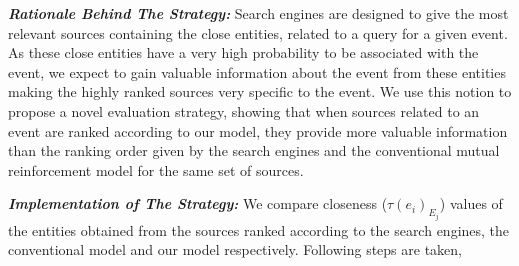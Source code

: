\noindent \textit{\textbf{Rationale Behind The Strategy:}} Search engines are designed to give the most relevant sources containing the close entities, related to a query for a given event. As these close entities have a very high probability to be associated with the event, we expect to gain valuable information about the event from these entities making the highly ranked sources very specific to the event. We use this notion to propose a novel evaluation strategy, showing that when sources related to an event are ranked according to our model, they provide more valuable information than the ranking order given by the search engines and the conventional mutual reinforcement model for the same set of sources.


\noindent \textit{\textbf{Implementation of The Strategy:}} We compare closeness ($\tau(e_{i})_{E_{j}}$) values of the entities obtained from the sources ranked according to the search engines, the conventional model  and our model respectively. Following steps are taken,
